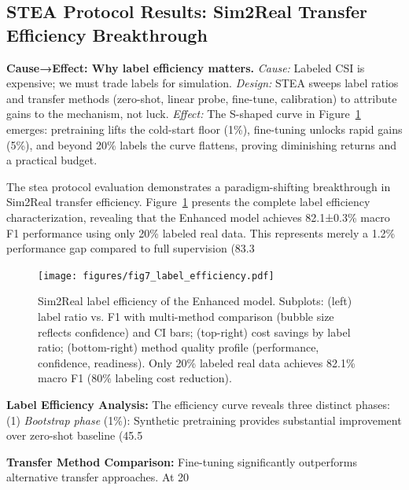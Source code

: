\documentclass[journal]{IEEEtran}
\begin{document}
\subsection{STEA Protocol Results: Sim2Real Transfer Efficiency Breakthrough}

\textbf{Cause→Effect: Why label efficiency matters.} \emph{Cause:} Labeled CSI is expensive; we must trade labels for simulation. \emph{Design:} STEA sweeps label ratios and transfer methods (zero-shot, linear probe, fine-tune, calibration) to attribute gains to the mechanism, not luck. \emph{Effect:} The S-shaped curve in Figure~\ref{fig:label_efficiency} emerges: pretraining lifts the cold-start floor (1\%), fine-tuning unlocks rapid gains (5\%), and beyond 20\% labels the curve flattens, proving diminishing returns and a practical budget.

The \gls{stea} protocol evaluation demonstrates a paradigm-shifting breakthrough in Sim2Real transfer efficiency. Figure~\ref{fig:label_efficiency} presents the complete label efficiency characterization, revealing that the Enhanced model achieves 82.1±0.3\% macro F1 performance using only 20\% labeled real data. This represents merely a 1.2\% performance gap compared to full supervision (83.3%

\begin{figure}[ht]
\centering
\texttt{[image: figures/fig7\_label\_efficiency.pdf]}%
\caption{Sim2Real label efficiency of the Enhanced model. Subplots: (left) label ratio vs. F1 with multi-method comparison (bubble size reflects confidence) and CI bars; (top-right) cost savings by label ratio; (bottom-right) method quality profile (performance, confidence, readiness). Only 20\% labeled real data achieves 82.1\% macro F1 (80\% labeling cost reduction).}
\label{fig:label_efficiency}
\end{figure}

\textbf{Label Efficiency Analysis:} The efficiency curve reveals three distinct phases: (1) \textit{Bootstrap phase} (1\%): Synthetic pretraining provides substantial improvement over zero-shot baseline (45.5%

\textbf{Transfer Method Comparison:} Fine-tuning significantly outperforms alternative transfer approaches. At 20%
\end{document}
